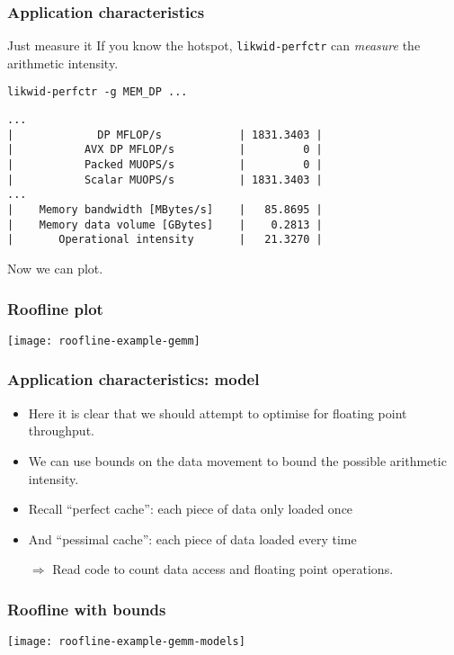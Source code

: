 \documentclass[presentation,aspectratio=43,10pt]{beamer}
\begin{document}
\begin{frame}[fragile]
  \frametitle{Application characteristics}
  \begin{exampleblock}{Just measure it}
    If you know the hotspot, \texttt{likwid-perfctr} can
    \emph{measure} the arithmetic intensity.

    \texttt{likwid-perfctr -g MEM\_DP ...}
\begin{verbatim}
...
|             DP MFLOP/s            | 1831.3403 |
|           AVX DP MFLOP/s          |         0 |
|           Packed MUOPS/s          |         0 |
|           Scalar MUOPS/s          | 1831.3403 |
...
|    Memory bandwidth [MBytes/s]    |   85.8695 |
|    Memory data volume [GBytes]    |    0.2813 |
|       Operational intensity       |   21.3270 |
\end{verbatim}

    Now we can plot.
  \end{exampleblock}
\end{frame}

\begin{frame}
  \frametitle{Roofline plot}
  \begin{center}
    \texttt{[image: roofline-example-gemm]}
  \end{center}
\end{frame}

\begin{frame}
  \frametitle{Application characteristics: model}
  \begin{itemize}
  \item Here it is clear that we should attempt to optimise for
    floating point throughput.
  \item We can use bounds on the data movement to bound the possible
    arithmetic intensity.
  \item Recall ``perfect cache'': each piece of data only loaded once
  \item And ``pessimal cache'': each piece of data loaded every time
  \item[$\Rightarrow$] Read code to count data access and floating
    point operations.
  \end{itemize}
\end{frame}
\begin{frame}
  \frametitle{Roofline with bounds}
  \begin{center}
    \texttt{[image: roofline-example-gemm-models]}
  \end{center}
\end{frame}
\end{document}
